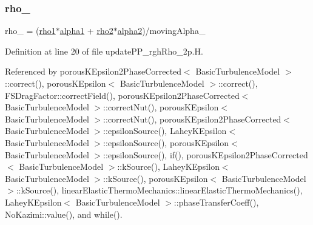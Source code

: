 \subsubsection{\texorpdfstring{rho\+\_\+}{rho\_}}
{\footnotesize\ttfamily rho\+\_\+ = (\hyperlink{UEqns__2p_8H_a80ad9333a5b4812b1033ab05efb3a65d}{rho1}$\ast$\hyperlink{UEqns__2p_8H_ad67e06bee4c61d3ec617e035493b4722}{alpha1} + \hyperlink{UEqns__2p_8H_a2a5e0e37e61560baf7b55ce8b70e01c0}{rho2}$\ast$\hyperlink{UEqns__2p_8H_abe544d8197b804c4439afde6d860d5d7}{alpha2})/moving\+Alpha\+\_\+}



Definition at line 20 of file update\+P\+P\+\_\+rgh\+Rho\+\_\+2p.\+H.



Referenced by porous\+K\+Epsilon2\+Phase\+Corrected$<$ Basic\+Turbulence\+Model $>$\+::correct(), porous\+K\+Epsilon$<$ Basic\+Turbulence\+Model $>$\+::correct(), F\+S\+Drag\+Factor\+::correct\+Field(), porous\+K\+Epsilon2\+Phase\+Corrected$<$ Basic\+Turbulence\+Model $>$\+::correct\+Nut(), porous\+K\+Epsilon$<$ Basic\+Turbulence\+Model $>$\+::correct\+Nut(), porous\+K\+Epsilon2\+Phase\+Corrected$<$ Basic\+Turbulence\+Model $>$\+::epsilon\+Source(), Lahey\+K\+Epsilon$<$ Basic\+Turbulence\+Model $>$\+::epsilon\+Source(), porous\+K\+Epsilon$<$ Basic\+Turbulence\+Model $>$\+::epsilon\+Source(), if(), porous\+K\+Epsilon2\+Phase\+Corrected$<$ Basic\+Turbulence\+Model $>$\+::k\+Source(), Lahey\+K\+Epsilon$<$ Basic\+Turbulence\+Model $>$\+::k\+Source(), porous\+K\+Epsilon$<$ Basic\+Turbulence\+Model $>$\+::k\+Source(), linear\+Elastic\+Thermo\+Mechanics\+::linear\+Elastic\+Thermo\+Mechanics(), Lahey\+K\+Epsilon$<$ Basic\+Turbulence\+Model $>$\+::phase\+Transfer\+Coeff(), No\+Kazimi\+::value(), and while().

